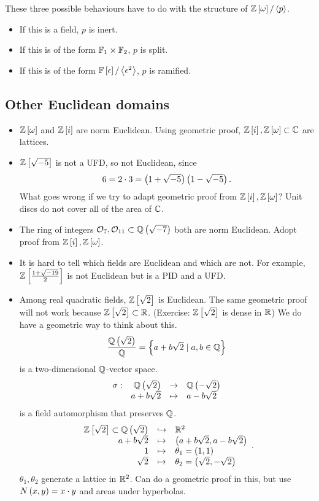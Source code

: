 \begin{remark*}
These three possible behaviours have to do with the structure of $ \mathbb{Z}\left[ \omega \right] / \left\langle p \right\rangle $.
\begin{itemize}
\item If this is a field, $ p $ is inert.
\item If this is of the form $ \mathbb{F}_1 \times \mathbb{F}_2 $, $ p $ is split.
\item If this is of the form $ \mathbb{F}\left[ \epsilon \right] / \left\langle \epsilon^2 \right\rangle $, $ p $ is ramified.
\end{itemize}
\end{remark*}

\pagebreak

\subsection{Other Euclidean domains}

\begin{itemize}
\item $ \mathbb{Z}\left[ \omega \right] $ and $ \mathbb{Z}\left[ i \right] $ are norm Euclidean. Using geometric proof, $ \mathbb{Z}\left[ i \right], \mathbb{Z}\left[ \omega \right] \subset \mathbb{C} $ are lattices.
\item $ \mathbb{Z}\left[ \sqrt{-5} \right] $ is not a UFD, so not Euclidean, since
$$ 6 = 2 \cdot 3 = \left( 1 + \sqrt{-5} \right)\left( 1 - \sqrt{-5} \right). $$
What goes wrong if we try to adapt geometric proof from $ \mathbb{Z}\left[ i \right], \mathbb{Z}\left[ \omega \right] $? Unit discs do not cover all of the area of $ \mathbb{C} $.
\item The ring of integers $ \mathcal{O}_7, \mathcal{O}_{11} \subset \mathbb{Q}\left( \sqrt{-7} \right) $ both are norm Euclidean. Adopt proof from $ \mathbb{Z}\left[ i \right], \mathbb{Z}\left[ \omega \right] $.
\item It is hard to tell which fields are Euclidean and which are not. For example, $ \mathbb{Z}\left[ \tfrac{1 + \sqrt{-19}}{2} \right] $ is not Euclidean but is a PID and a UFD.
\item Among real quadratic fields, $ \mathbb{Z}\left[ \sqrt{2} \right] $ is Euclidean. The same geometric proof will not work because $ \mathbb{Z}\left[ \sqrt{2} \right] \subset \mathbb{R} $. (Exercise: $ \mathbb{Z}\left[ \sqrt{2} \right] $ is dense in $ \mathbb{R} $) We do have a geometric way to think about this.
$$ \dfrac{\mathbb{Q}\left( \sqrt{2} \right)}{\mathbb{Q}} = \left\{ a + b\sqrt{2} \mid a, b \in \mathbb{Q} \right\} $$
is a two-dimensional $ \mathbb{Q} $-vector space.
$$ \function[\sigma]{\Q\rb{\sqrt{2}}}{\Q\rb{-\sqrt{2}}}{a + b\sqrt{2}}{a - b\sqrt{2}} $$
is a field automorphism that preserves $ \mathbb{Q} $.
$$
\begin{array}{rcl}
\mathbb{Z}\left[ \sqrt{2} \right] \subset \mathbb{Q}\left( \sqrt{2} \right) & \hookrightarrow & \mathbb{R}^2 \\
a + b\sqrt{2} & \mapsto & \left( a + b\sqrt{2}, a - b\sqrt{2} \right) \\
1 & \mapsto & \theta_1 = \left( 1, 1 \right) \\
\sqrt{2} & \mapsto & \theta_2 = \left( \sqrt{2}, -\sqrt{2} \right)
\end{array}.
$$
$ \theta_1, \theta_2 $ generate a lattice in $ \mathbb{R}^2 $. Can do a geometric proof in this, but use $ N\left( x, y \right) = x \cdot y $ and areas under hyperbolas.
\end{itemize}

